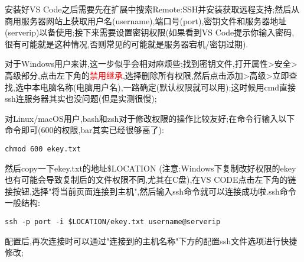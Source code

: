 安装好VS Code之后需要先在扩展中搜索Remote:SSH并安装获取远程支持;然后从商用服务器网站上获取用户名(username),端口号(port),密钥文件和服务器地址(serverip)以备使用;接下来需要设置密钥权限(如果看到VS Code提示你输入密码,很有可能就是这种情况,否则常见的可能就是服务器宕机/密钥过期).\par

对于Windows用户来讲,这一步似乎会相对麻烦些;找到密钥文件,打开属性>安全>高级部分,点击左下角的\textcolor{red}{禁用继承},选择删除所有权限,然后点击添加>高级>立即查找,选中本电脑名称(电脑用户名),一路确定(默认权限就可以用);这时候用cmd直接ssh连服务器其实也没问题(但是实测很慢);\par

对Linux/macOS用户,bash和zsh对于修改权限的操作比较友好;在命令行输入以下命令即可(600的权限,bar其实已经很够高了):\par
\begin{lstlisting}[frame=single]
chmod 600 ekey.txt
\end{lstlisting}
\par


然后copy一下ekey.txt的地址\$LOCATION (注意:Windows下复制改好权限的ekey也有可能会导致复制后的文件权限不同,尤其在C盘),在VS CODE点击左下角的链接按钮,选择"将当前页面连接到主机",然后输入ssh命令就可以连接成功啦.ssh命令一般结构:\par

\begin{lstlisting}[frame=single]
ssh -p port -i $LOCATION/ekey.txt username@serverip
\end{lstlisting}
\par

配置后,再次连接时可以通过"连接到的主机名称"下方的配置ssh文件选项进行快捷修改;






